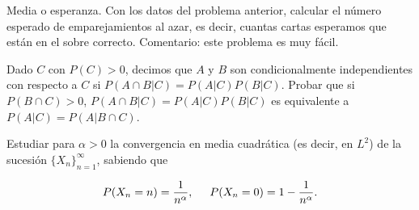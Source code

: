 
\begin{problem}[12] Media o esperanza. Con los datos del problema anterior, calcular el n\'umero esperado de
emparejamientos al azar, es decir, cuantas cartas esperamos que est\'an en el sobre correcto.
Comentario: este problema es muy f\'acil.
\solution

\begin{expla}

\end{expla}

\end{problem}


\begin{problem}[13] Dado $C$ con $P(C) > 0$, decimos que $A$ y $B$ son condicionalmente independientes
con respecto a $C$ si $P(A\cap B|C) =P(A|C) P(B|C)$. Probar que si  $P(B\cap C) > 0$, 
$P(A\cap B|C) =P(A|C) P(B|C)$ es equivalente a $P(A|C) = P(A|B \cap C)$. 


\solution

\begin{expla}

\end{expla}

\end{problem}


\begin{problem}[14] Estudiar para $ \alpha>0 $ la convergencia en
media cuadr\'atica (es decir, en $L^2$) de la sucesi\'on $\{X_n\}_{n=1}^\infty$, sabiendo que

\[  P(X_n=n)=\frac{1}{n^\alpha}, \hspace{5mm} P(X_n=0)=1-\frac{1}{n^\alpha}.
  \]
\solution

\begin{expla}

\end{expla}

\end{problem}






